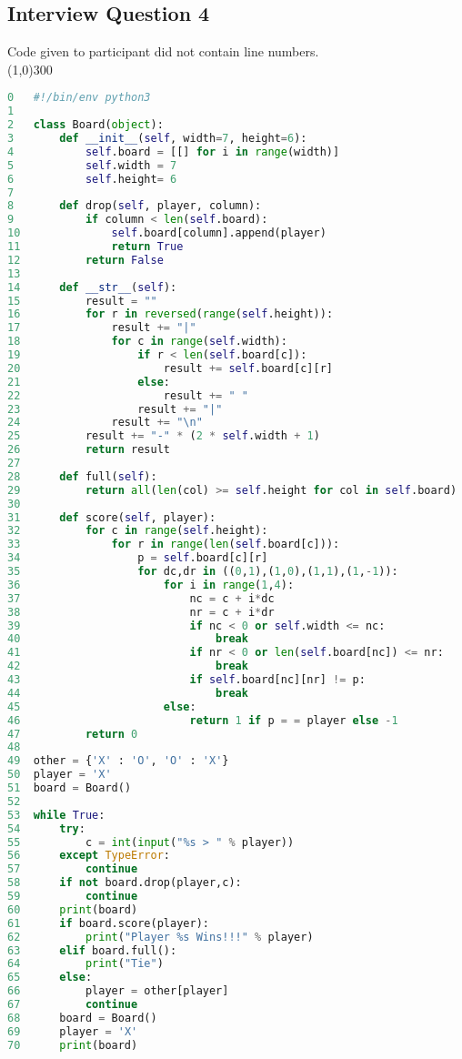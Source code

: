 \documentclass{article}
\begin{document}
\subsection{Interview Question 4}
Code given to participant did not contain line numbers. \\
\line(1,0){300}
\begin{lstlisting}[language=python]
0 	#!/bin/env python3
1
2 	class Board(object):
3 		def __init__(self, width=7, height=6):
4 			self.board = [[] for i in range(width)]
5 			self.width = 7
6 			self.height= 6
7 	
8 		def drop(self, player, column):
9 			if column < len(self.board):
10				self.board[column].append(player)
11				return True
12			return False
13	
14		def __str__(self):
15			result = ""
16			for r in reversed(range(self.height)):
17				result += "|"
18				for c in range(self.width):
19					if r < len(self.board[c]):
20						result += self.board[c][r]
21					else:
22						result += " "
23					result += "|"
24				result += "\n"
25			result += "-" * (2 * self.width + 1)
26			return result
27	
28		def full(self):
29			return all(len(col) >= self.height for col in self.board)
30	
31		def score(self, player):
32			for c in range(self.height):
33				for r in range(len(self.board[c])):
34					p = self.board[c][r]
35					for dc,dr in ((0,1),(1,0),(1,1),(1,-1)):
36						for i in range(1,4):
37							nc = c + i*dc
38							nr = c + i*dr
39							if nc < 0 or self.width <= nc:
40								break
41							if nr < 0 or len(self.board[nc]) <= nr:
42								break
43							if self.board[nc][nr] != p:
44								break
45						else:
46							return 1 if p = = player else -1
47			return 0
48
49	other = {'X' : 'O', 'O' : 'X'}
50	player = 'X'
51	board = Board()
52
53	while True:
54		try:
55			c = int(input("%s > " % player))
56		except TypeError:
57			continue
58		if not board.drop(player,c):
59			continue
60		print(board)
61		if board.score(player):
62			print("Player %s Wins!!!" % player)
63		elif board.full():
64			print("Tie")
65		else:
66			player = other[player]
67			continue
68		board = Board()
69		player = 'X'
70		print(board)
\end{lstlisting}
\end{document}
